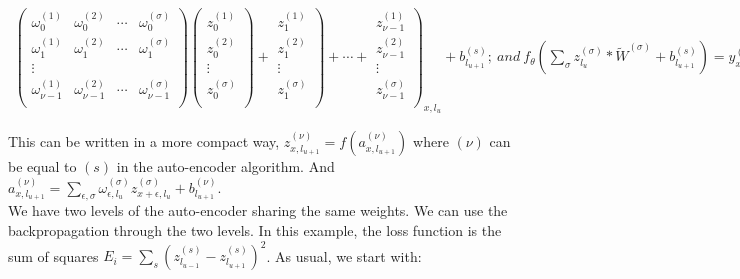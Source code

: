 \documentclass[final, paper=letter,5p,times,twocolumn]{elsarticle}
\begin{document}
\begin{strip}
  \begin{eqnarray*}
      \left(
      \begin{array}{cccc}
        \omega_{0}^{(1)} & \omega_{0}^{(2)} & \cdots & \omega_{0}^{(\sigma)} \\
        \omega_{1}^{(1)} & \omega_{1}^{(2)} & \cdots & \omega_{1}^{(\sigma)} \\
        \vdots \\
        \omega_{\nu-1}^{(1)} & \omega_{\nu-1}^{(2)} & \cdots & \omega_{\nu-1}^{(\sigma)} \\
      \end{array}
      \right) \left(
      \begin{array}{c}
        z_{0}^{(1)} \\
        z_{0}^{(2)} \\
        \vdots \\
        z_{0}^{(\sigma)} \\
      \end{array}
      \right) + \left. 
      \begin{array}{c}
        z_{1}^{(1)} \\
        z_{1}^{(2)} \\
        \vdots \\
        z_{1}^{(\sigma)} \\
      \end{array}
      \right) + \cdots + \left. 
      \begin{array}{c}
        z_{\nu-1}^{(1)} \\
        z_{\nu-1}^{(2)} \\
        \vdots \\
        z_{\nu-1}^{(\sigma)} \\
      \end{array}
      \right)_{x,l_{u}} + b_{l_{u+1}}^{(s)};~and~f_{\theta}\left(\sum_{\sigma} z_{l_{u}}^{(\sigma)}*\tilde{W}^{(\sigma)} + b_{l_{u+1}}^{(s)} \right) = y_{x,l_{u+1}}^{(s)}
  \end{eqnarray*}
\end{strip}

This can be written in a more compact way, $z_{x,l_{u+1}}^{(\nu)} = f(a_{x,l_{u+1}}^{(\nu)})$ where $(\nu)$ can be equal to $(s)$ in the auto-encoder algorithm. And $a_{x,l_{u+1}}^{(\nu)} = \sum_{\epsilon,\sigma} \omega_{\epsilon,l_{u}}^{(\sigma)}z_{x+\epsilon,l_{u}}^{(\sigma)} + b_{l_{u+1}}^{(\nu)}$. \\
We have two levels of the auto-encoder sharing the same weights. We can use the backpropagation through the two levels. In this example, the loss function is the sum of squares $E_{i} = \sum_{s} (z_{l_{u-1}}^{(s)} - z_{l_{u+1}}^{(s)})^{2}$. As usual, we start with:
\end{document}
